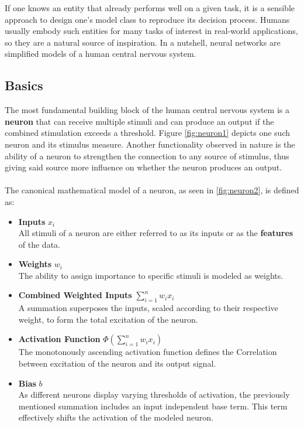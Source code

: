 If one knows an entity that already performs well on a given task, it is a sensible approach to design one's model class to reproduce its decision process. Humans usually embody such entities for many tasks of interest in real-world applications, so they are a natural source of inspiration. In a nutshell, neural networks are simplified models of a human central nervous system.\\

\subsection{Basics}
The most fundamental building block of the human central nervous system is a \textbf{neuron} that can receive multiple stimuli and can produce an output if the combined stimulation exceeds a threshold. Figure \ref{fig:neuron1} depicts one such neuron and its stimulus measure. Another functionality observed in nature is the ability of a neuron to strengthen the connection to any source of stimulus, thus giving said source more influence on whether the neuron produces an output.\cite{Biology_Background}\\
\\
The canonical mathematical model of a neuron, as seen in \ref{fig:neuron2}, is defined as:
\begin{itemize}
	\item \textbf{Inputs} $x_i$\\
	All stimuli of a neuron are either referred to as its inputs or as the \textbf{features} of the data.\\
	\item \textbf{Weights} $w_i$\\
	The ability to assign importance to specific stimuli is modeled as weights.\\
	\item \textbf{Combined Weighted Inputs} $\sum_{i=1}^{n}w_i x_i$\\
	A summation superposes the inputs, scaled according to their respective weight, to form the total excitation of the neuron.\\
	\item \textbf{Activation Function} $\Phi(\sum_{i=1}^{n}w_i x_i)$\\
	The monotonously ascending activation function defines the Correlation between excitation of the neuron and its output signal.\\
	\item \textbf{Bias} $b$\\  
	As different neurons display varying thresholds of activation, the previously mentioned summation includes an input independent base term. This term effectively shifts the activation of the modeled neuron.\\
\end{itemize}

